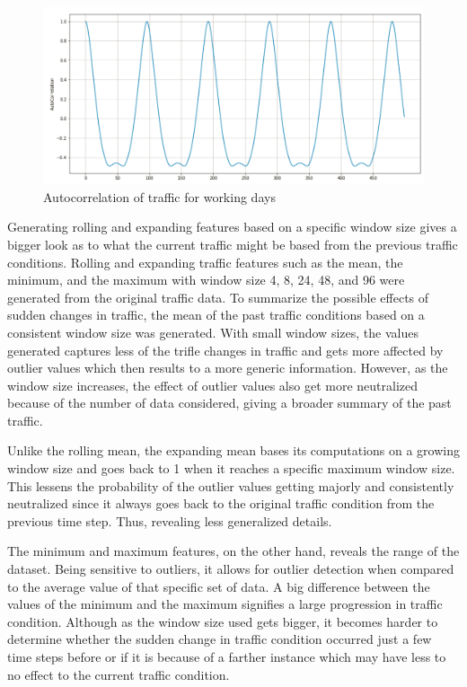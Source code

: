 \begin{figure}
  \includegraphics[width=\linewidth]{figures/autocorr_whyRE.PNG}
  \caption{Autocorrelation of traffic for working days}
  \label{figure_workingday_autocorr}
\end{figure}

Generating rolling and expanding features based on a specific window size gives a bigger look as to what the current traffic might be based from the previous traffic conditions. Rolling and expanding traffic features such as the mean, the minimum, and the maximum with window size  4, 8, 24, 48, and 96 were generated from the original traffic data. To summarize the possible effects of sudden changes in traffic, the mean of the past traffic conditions based on a consistent window size was generated. With small window sizes, the values generated captures less of the trifle changes in traffic and gets more affected by outlier values which then results to a more generic information. However, as the window size increases, the effect of outlier values also get more neutralized because of the number of data considered, giving a broader summary of the past traffic. 

Unlike the rolling mean, the expanding mean bases its computations on a growing window size and goes back to 1 when it reaches a specific maximum window size. This lessens the probability of the outlier values getting majorly and consistently neutralized since it always goes back to the original traffic condition from the previous time step. Thus, revealing less generalized details.

The minimum and maximum features, on the other hand, reveals the range of the dataset. Being sensitive to outliers, it allows for outlier detection when compared to the average value of that specific set of data. A big difference between the values of the minimum and the maximum signifies a large progression in traffic condition. Although as the window size used gets bigger, it becomes harder to determine whether the sudden change in traffic condition occurred just a few time steps before or if it is because of a farther instance which may have less to no effect to the current traffic condition. 

